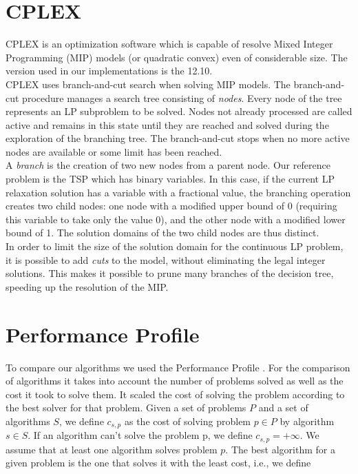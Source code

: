 \section{CPLEX}
CPLEX is an optimization software which is capable of resolve Mixed Integer Programming (MIP) models (or quadratic convex) even of considerable size. The version used in our implementations is the 12.10.\\
CPLEX uses branch-and-cut search when solving MIP models. The branch-and-cut procedure manages a search tree consisting of \textit{nodes}. Every node of the tree represents an LP subproblem to be solved. Nodes not already processed are called active and remains in this state until they are reached and solved during the exploration of the branching tree. The branch-and-cut stops when no more active nodes are available or some limit has been reached.\\
A \textit{branch} is the creation of two new nodes from a parent node. Our reference problem is the TSP which has binary variables. In this case, if the current LP relaxation solution has a variable with a fractional value, the branching operation creates two child nodes: one node with a modified upper bound of 0 (requiring this variable to take only the value 0), and the other node with a modified lower bound of 1. The solution domains of the two child nodes are thus distinct.\\
In order to limit the size of the solution domain for the continuous LP problem, it is possible to add \textit{cuts} to the model, without eliminating the legal integer solutions. This makes it possible to prune many branches of the decision tree, speeding up the resolution of the MIP.

\section{Performance Profile}
To compare our algorithms we used the Performance Profile \cite{dolan2002benchmarking}. For the comparison of algorithms it takes into account the number of problems solved as well as the cost it took to solve them. It scaled the cost of solving the problem according to the best solver for that problem. Given a set of problems $P$ and a set of algorithms $S$, we define $c_{s,p}$ as the cost of solving problem $p \in P$ by algorithm $s\in S$. If an algorithm can’t solve the problem p, we define $c_{s,p} = +\infty$. We assume that at least one algorithm solves problem $p$. The best algorithm for a given problem is the one that solves it with the least cost, i.e., we define


